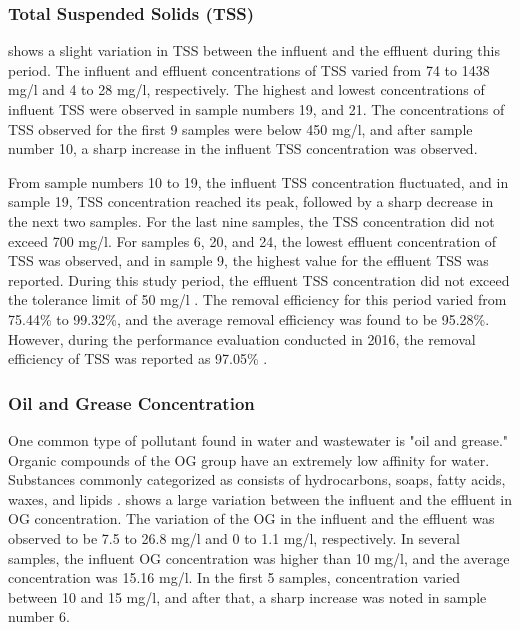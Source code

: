 


\subsubsection{Total Suspended Solids (TSS)}
 shows a slight variation in \ac{TSS} between the influent and the effluent during this period. The influent and effluent concentrations of \ac{TSS} varied from 74 to 1438 mg/l and 4 to 28 mg/l, respectively. The highest and lowest concentrations of influent \ac{TSS} were observed in sample numbers 19, and 21. The concentrations of \ac{TSS} observed for the first 9 samples were below 450 mg/l, and after sample number 10, a sharp increase in the influent \ac{TSS} concentration was observed.

From sample numbers 10 to 19, the influent \ac{TSS} concentration fluctuated, and in sample 19, \ac{TSS} concentration reached its peak, followed by a sharp decrease in the next two samples. For the last nine samples, the \ac{TSS} concentration did not exceed 700 mg/l. For samples 6, 20, and 24, the lowest effluent concentration of \ac{TSS} was observed, and in sample 9, the highest value for the effluent \ac{TSS} was reported. During this study period, the effluent \ac{TSS} concentration did not exceed the tolerance limit of 50 mg/l \cite{CEA2022}. The removal efficiency for this period varied from 75.44\% to 99.32\%, and the average removal efficiency was found to be 95.28\%. However, during the performance evaluation conducted in 2016, the removal efficiency of \ac{TSS} was reported as 97.05\% \cite{Danushika2016}.



\subsubsection{Oil and Grease Concentration}

One common type of pollutant found in water and wastewater is "oil and grease." Organic compounds of the \ac{OG} group have an extremely low affinity for water. Substances commonly categorized as consists of hydrocarbons, soaps, fatty acids, waxes, and lipids \cite{Pintor2016}.  shows a large variation between the influent and the effluent in \ac{OG} concentration. The variation of the \ac{OG} in the influent and the effluent was observed to be 7.5 to 26.8 mg/l and 0 to 1.1 mg/l, respectively. In several samples, the influent \ac{OG} concentration was higher than 10 mg/l, and the average concentration was 15.16 mg/l. In the first 5 samples, concentration varied between 10 and 15 mg/l, and after that, a sharp increase was noted in sample number 6.

